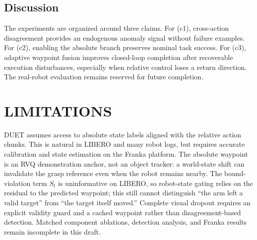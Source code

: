 \documentclass[letterpaper, 10 pt, conference]{ieeeconf}
\begin{document}
\begin{table}[t]
\caption{Real-robot evaluation. Success entries are reported as successes/trials (\%); retry success conditions only on trials meeting the prespecified injection criteria. Values and disturbance definitions are placeholders pending physical experiments.}
\label{tab:real_robot}
\centering
{}
\end{table}

\subsection{Discussion}
The experiments are organized around three claims. For (c1), cross-action disagreement provides an endogenous anomaly signal without failure examples. For (c2), enabling the absolute branch preserves nominal task success. For (c3), adaptive waypoint fusion improves closed-loop completion after recoverable execution disturbances, especially when relative control loses a return direction. The real-robot evaluation remains reserved for future completion.

\section{LIMITATIONS}

DUET assumes access to absolute state labels aligned with the relative action chunks. This is natural in LIBERO and many robot logs, but requires accurate calibration and state estimation on the Franka platform. The absolute waypoint is an RVQ demonstration anchor, not an object tracker: a world-state shift can invalidate the grasp reference even when the robot remains nearby. The bound-violation term $S_t$ is uninformative on LIBERO, so robot-state gating relies on the residual to the predicted waypoint; this still cannot distinguish ``the arm left a valid target'' from ``the target itself moved.'' Complete visual dropout requires an explicit validity guard and a cached waypoint rather than disagreement-based detection. Matched component ablations, detection analysis, and Franka results remain incomplete in this draft.
\end{document}
